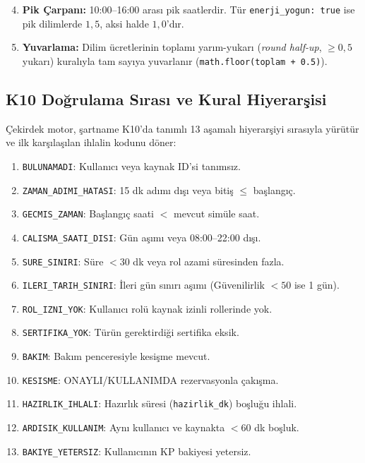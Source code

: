 \documentclass[conference]{IEEEtran}
\begin{document}
\begin{enumerate}
    \setcounter{enumi}{3}
    \item \textbf{Pik Çarpanı:} 10:00--16:00 arası pik saatlerdir. Tür \texttt{enerji\_yogun: true} ise pik dilimlerde $1{,}5$, aksi halde $1{,}0$'dır.
    \item \textbf{Yuvarlama:} Dilim ücretlerinin toplamı yarım-yukarı (\textit{round half-up}, $\ge 0{,}5$ yukarı) kuralıyla tam sayıya yuvarlanır (\texttt{math.floor(toplam + 0.5)}).
\end{enumerate}

\subsection{K10 Doğrulama Sırası ve Kural Hiyerarşisi}
Çekirdek motor, şartname K10'da tanımlı 13 aşamalı hiyerarşiyi sırasıyla yürütür ve ilk karşılaşılan ihlalin kodunu döner:
\begin{enumerate}
    \item \texttt{BULUNAMADI}: Kullanıcı veya kaynak ID'si tanımsız.
    \item \texttt{ZAMAN\_ADIMI\_HATASI}: 15 dk adımı dışı veya bitiş $\le$ başlangıç.
    \item \texttt{GECMIS\_ZAMAN}: Başlangıç saati $<$ mevcut simüle saat.
    \item \texttt{CALISMA\_SAATI\_DISI}: Gün aşımı veya 08:00--22:00 dışı.
    \item \texttt{SURE\_SINIRI}: Süre $<30$ dk veya rol azami süresinden fazla.
    \item \texttt{ILERI\_TARIH\_SINIRI}: İleri gün sınırı aşımı (Güvenilirlik $<50$ ise 1 gün).
    \item \texttt{ROL\_IZNI\_YOK}: Kullanıcı rolü kaynak izinli rollerinde yok.
    \item \texttt{SERTIFIKA\_YOK}: Türün gerektirdiği sertifika eksik.
    \item \texttt{BAKIM}: Bakım penceresiyle kesişme mevcut.
    \item \texttt{KESISME}: ONAYLI/KULLANIMDA rezervasyonla çakışma.
    \item \texttt{HAZIRLIK\_IHLALI}: Hazırlık süresi (\texttt{hazirlik\_dk}) boşluğu ihlali.
    \item \texttt{ARDISIK\_KULLANIM}: Aynı kullanıcı ve kaynakta $<60$ dk boşluk.
    \item \texttt{BAKIYE\_YETERSIZ}: Kullanıcının KP bakiyesi yetersiz.
\end{enumerate}
\end{document}
